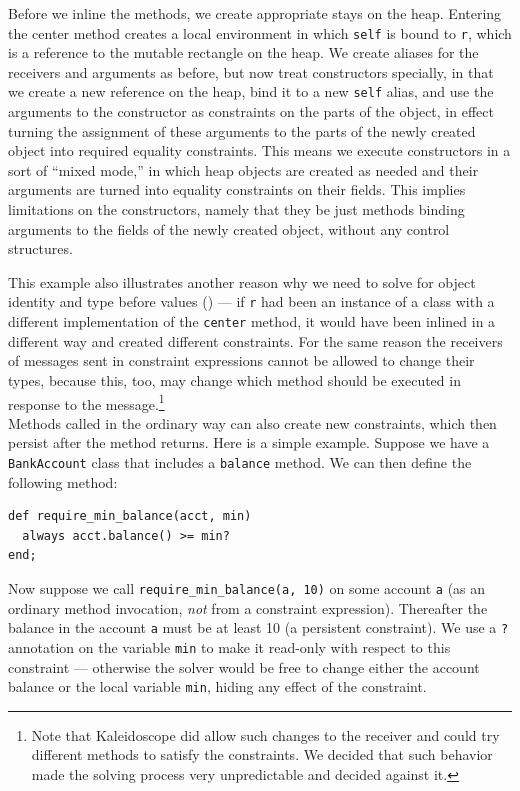Before we inline the methods, we create appropriate stays on the
heap. Entering the center method creates a local environment in which
\verb|self| is bound to \verb|r|\@, which is a reference to the
mutable rectangle on the heap. We create aliases for the receivers and
arguments as before, but now treat constructors specially, in that we
create a new reference on the heap, bind it to a new \verb!self!
alias, and use the arguments to the constructor as constraints on the
parts of the object, in effect turning the assignment of these
arguments to the parts of the newly created object into required
equality constraints. This means we execute constructors in a sort of
``mixed mode,'' in which heap objects are created as needed and their
arguments are turned into equality constraints on their fields. This
implies limitations on the constructors, namely that they be just
methods binding arguments to the fields of the newly created object,
without any control structures.

This example also illustrates another reason why we need to solve for
object identity and type before values ()
--- if \verb|r| had been an instance of a class with a different
implementation of the \verb|center| method, it would have been inlined
in a different way and created different constraints. For the same
reason the receivers of messages sent in constraint expressions cannot
be allowed to change their types, because this, too, may change which
method should be executed in response to the message.\footnote{Note
  that Kaleidoscope did allow such changes to the receiver and could
  try different methods to satisfy the constraints. We decided that
  such behavior made the solving process very unpredictable and
  decided against it.}\\

Methods called in the ordinary way can also create new constraints,
which then persist after the method returns. Here is a simple example.
Suppose we have a \verb|BankAccount| class that includes a
\verb|balance| method.  We can then define the following method:
\begin{lstlisting}
def require_min_balance(acct, min)
  always acct.balance() >= min?
end;
\end{lstlisting}
Now suppose we call \verb|require_min_balance(a, 10)| on some account
\verb|a| (as an ordinary method invocation, \emph{not} from a
constraint expression).  Thereafter the balance in the account
\verb|a| must be at least 10 (a persistent constraint).  We use a
\verb|?| annotation on the variable \verb|min| to make it read-only
with respect to this constraint --- otherwise the solver would be free
to change either the account balance or the local variable \verb|min|,
hiding any effect of the constraint.

